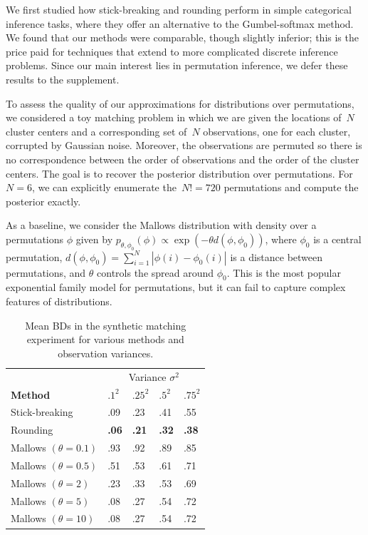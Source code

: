 \documentclass[twoside]{article}
\begin{document}
We first studied how stick-breaking and rounding perform in simple
categorical inference tasks, where they offer an alternative to the
Gumbel-softmax method.  We found that our methods were comparable,
though slightly inferior; this is the price paid for techniques that
extend to more complicated discrete inference problems. Since our
main interest lies in permutation inference, we defer these results
to the supplement. 

To assess the quality of our approximations for distributions over
permutations, we considered a toy matching problem in which we are
given the locations of~$N$ cluster centers and a corresponding set
of~$N$ observations, one for each cluster, corrupted by Gaussian
noise.  Moreover, the observations are permuted so there is no
correspondence between the order of observations and the order of the
cluster centers.  The goal is to recover the posterior distribution
over permutations.  For~$N=6$, we can explicitly enumerate
the~$N!=720$ permutations and compute the posterior exactly.
 
 As a baseline, we consider the Mallows distribution
 \cite{Mallows1957} with density over a permutations $\phi$ given by
 $p_{\theta, \phi_0}(\phi)\propto \exp(-\theta d(\phi,\phi_0))$, where
 $\phi_0$ is a central permutation,
 ${d(\phi,\phi_0)=\sum_{i=1}^N |\phi(i)-\phi_0(i)|}$ is a distance
 between permutations, and $\theta$ controls the spread around
 $\phi_0$. This is the most popular exponential family model for
 permutations, but it can fail to capture complex features of
 distributions.

 \begin{table}[h]
  \caption{Mean BDs in the synthetic matching experiment for various methods and observation variances.}
  \label{table:BDs}
  \centering
  \begin{tabular}{lllll}
    & \multicolumn{4}{c}{Variance $\sigma^2$} \\
    \cmidrule(lr){3-4} 
    \textbf{Method} & $.1^2$ & $.25^2$ & $.5^2$ & $.75^2$ \\
    \hline
    Stick-breaking & .09 & .23 & .41 & .55 \\
    Rounding & \textbf{.06} & \textbf{.21}  & \textbf{.32}  & \textbf{.38} \\
    Mallows $(\theta=0.1)$ & .93 & .92 & .89  & .85 \\
    Mallows $(\theta=0.5)$ & .51 & .53  & .61 & .71 \\
    Mallows $(\theta=2)$ & .23 & .33 & .53  & .69 \\
    Mallows $(\theta=5)$ & .08 & .27 & .54 & .72 \\
    Mallows $(\theta=10)$ & .08 & .27 & .54  & .72 \\
    \bottomrule
  \end{tabular}
\end{table}
\end{document}
